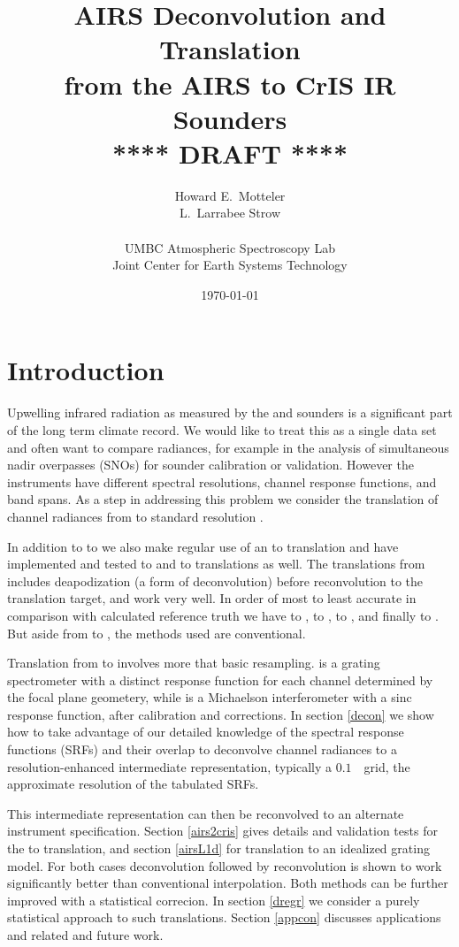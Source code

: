 \documentclass[11pt]{article}
\title{AIRS Deconvolution and Translation \\
  from the AIRS to CrIS IR Sounders \\
  \vspace{3mm}
  {****} DRAFT {****}\\
}
\author{Howard E.~Motteler \\
  L.~Larrabee Strow \\
  \\
  UMBC Atmospheric Spectroscopy Lab \\
  Joint Center for Earth Systems Technology \\
}
\date{\today}
\begin{document}
\maketitle

\section{Introduction}

Upwelling infrared radiation as measured by the {\airs} \cite{airs1}
and {\cris} \cite{cris1,cris2} sounders is a significant part of the
long term climate record.  We would like to treat this as a single
data set and often want to compare radiances, for example in the
analysis of simultaneous nadir overpasses (SNOs) for sounder
calibration or validation.  However the instruments have different
spectral resolutions, channel response functions, and band spans.
As a step in addressing this problem we consider the translation of
channel radiances from {\airs} to standard resolution {\cris}.

In addition to {\airs} to {\cris} we also make regular use of an
{\iasi} to {\cris} translation and have implemented and tested
{\iasi} to {\airs} and {\cris} to {\airs} translations as well.  
The translations from {\iasi} includes deapodization (a form of
deconvolution) before reconvolution to the translation target, and
work very well.  In order of most to least accurate in comparison
with calculated reference truth we have {\iasi} to {\cris}, {\iasi}
to {\airs}, {\airs} to {\cris}, and finally {\cris} to {\airs}
\cite{deconATBD}.  But aside from {\airs} to {\cris}, the methods
used are conventional.

Translation from {\airs} to {\cris} involves more that basic
resampling.  {\airs} is a grating spectrometer with a distinct
response function for each channel determined by the focal plane
geometery, while {\cris} is a Michaelson interferometer with a sinc
response function, after calibration and corrections.  In section
\ref{decon} we show how to take advantage of our detailed knowledge
of the {\airs} spectral response functions (SRFs) and their overlap
to deconvolve channel radiances to a resolution-enhanced
intermediate representation, typically a $0.1$~\wn\ grid, the
approximate resolution of the tabulated {\airs} SRFs.  

This intermediate representation can then be reconvolved to an
alternate instrument specification.  Section \ref{airs2cris} gives
details and validation tests for the {\airs} to {\cris} translation,
and section \ref{airsL1d} for translation to an idealized grating
model.  For both cases deconvolution followed by reconvolution is
shown to work significantly better than conventional interpolation.
Both methods can be further improved with a statistical correcion.
In section \ref{dregr} we consider a purely statistical approach to
such translations.  Section \ref{appcon} discusses applications and
related and future work.
\end{document}
